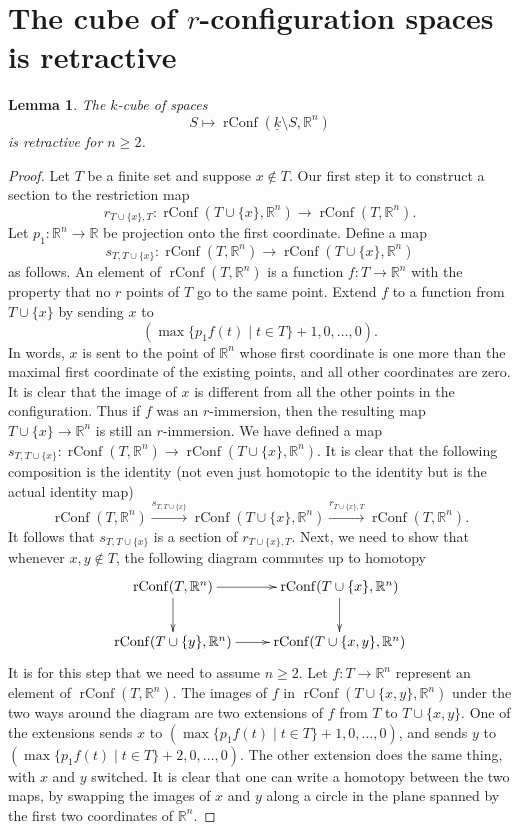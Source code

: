 \documentclass[12pt]{amsart}
\newcommand{\R}{{\mathbb R}}
\newcommand{\rConf}{\operatorname{rConf}}
\theoremstyle{plain}
\newtheorem{lemma}[thm]{Lemma}
\theoremstyle{definition}
\theoremstyle{remark}
\begin{document}
\section{The cube of $r$-configuration spaces is retractive}\label{S: Conf is retractive}
\begin{lemma}\label{lemma: config retractive}
The $k$-cube of spaces $$S \mapsto \rConf(\underline{k} \setminus S, \R^n) $$ is retractive for $n\ge 2$.
\end{lemma}
\begin{proof}
Let $T$ be a finite set and suppose $x\notin T$. Our first step it to construct a section to the restriction map
\[
r_{T\cup\{x\}, T}\colon \rConf(T\cup\{x\}, \R^n)\to \rConf(T, \R^n).
\]
Let $p_1\colon \R^n \to \R$ be projection onto the first coordinate. Define a map
\[
s_{T, T\cup\{x\}}\colon \rConf(T, \R^n) \to \rConf(T\cup\{x\}, \R^n)
\]
as follows. An element of $\rConf(T, \R^n)$ is a function $f\colon T\to \R^n$ with the property that no $r$ points of $T$ go to the same point. Extend $f$ to a function from $T\cup\{x\}$ by sending $x$ to
\[
(\max \{p_1f(t)\mid t\in T\}+1, 0, \ldots, 0).
\]
In words, $x$ is sent to the point of $\R^n$ whose first  coordinate is one more than the maximal first coordinate of the existing points, and all other coordinates are zero. It is clear that the image of $x$ is different from all the other points in the configuration. Thus if $f$ was an $r$-immersion, then the resulting map $T\cup\{x\}\to \R^n$ is still an $r$-immersion. We have defined a map $s_{T, T\cup\{x\}}\colon\rConf(T, \R^n) \to \rConf(T\cup\{x\}, \R^n)$.
It is clear that the following composition is the identity (not even just homotopic to the identity but is the actual identity map)
\[
\rConf(T, \R^n) \xrightarrow{s_{T, T\cup\{x\}}} \rConf(T\cup\{x\}, \R^n)\xrightarrow{r_{T\cup\{x\}, T}}\rConf(T, \R^n).
\]
It follows that $s_{T, T\cup\{x\}}$ is a section of $r_{T\cup\{x\}, T}$. Next, we need to show that whenever $x, y\notin T$, the following diagram commutes up to homotopy
$$
\begin{aligned}
\xymatrix{
\rConf(T,\R^n) \ar[r] \ar[d] & \rConf(T\cup \{x\},\R^n) \ar[d] \\
\rConf(T\cup\{y\},\R^n) \ar[r]       &  \rConf(T\cup\{x,y\},\R^n)
}
\end{aligned}
$$
It is for this step that we need to assume $n\ge 2$. Let $f\colon T\to \R^n$ represent an element of $\rConf(T,\R^n)$. The images of $f$ in $\rConf(T\cup\{x,y\},\R^n)$ under the two ways around the diagram are two extensions of $f$ from $T$ to $T\cup\{x, y\}$. One of the extensions sends $x$ to $(\max \{p_1f(t)\mid t\in T\}+1, 0, \ldots, 0)$, and sends $y$ to $(\max \{p_1f(t)\mid t\in T\}+2, 0, \ldots, 0)$. The other extension does the same thing, with $x$ and $y$ switched. It is clear that one can write a homotopy between the two maps, by swapping the images of $x$ and $y$ along a circle in the plane spanned by the first two coordinates of $\R^n$.


\end{proof}
\end{document}
